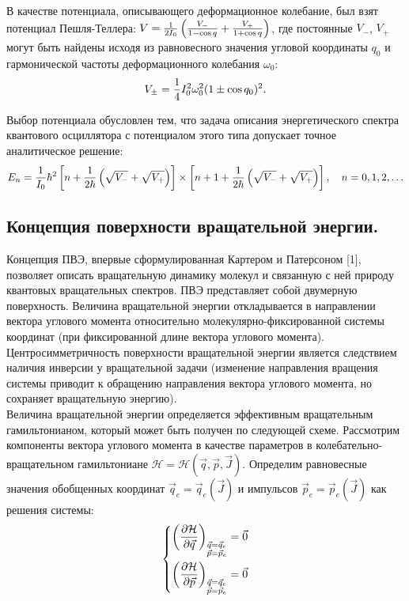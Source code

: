 В качестве потенциала, описывающего деформационное колебание, был взят потенциал Пешля-Теллера: $V = \frac{1}{2I_0} \left( \frac{V_{-}}{1 - \cos q} + \frac{V_{+}}{1 + \cos q} \right)$, где постоянные $V_{-}$, $V_{+}$ могут быть найдены исходя из равновесного значения угловой координаты $q_0$ и гармонической частоты деформационного колебания $\omega_0$:
\vverh
\begin{gather}
V_{\pm} = \frac{1}{4} I_0^2 \omega_0^2 (1 \pm \cos q_0 )^2. \notag
\end{gather}

Выбор потенциала обусловлен тем, что задача описания энергетического спектра квантового осциллятора с потенциалом этого типа допускает точное аналитическое решение:
\vverh
\begin{gather}
E_n = \frac{1}{I_0} \hbar^2 \left[ n + \frac{1}{2 \hbar} \left( \sqrt{V_{-}} + \sqrt{V_{+}} \right) \right] \times \left[ n + 1 + \frac{1}{2 \hbar} \left( \sqrt{V_{-}} + \sqrt{V_{+}} \right) \right], \quad n = 0, 1, 2, \dots \notag 
\end{gather}

\subsection{Концепция поверхности вращательной энергии.}

Концепция ПВЭ, впервые сформулированная Картером и Патерсоном [1], позволяет описать вращательную динамику молекул и связанную с ней природу квантовых вращательных спектров. ПВЭ представляет собой двумерную поверхность. Величина вращательной энергии откладывается в направлении вектора углового момента относительно молекулярно-фиксированной системы координат (при фиксированной длине вектора углового момента). Центросимметричность поверхности вращательной энергии является следствием наличия инверсии у вращательной задачи (изменение направления вращения системы приводит к обращению направления вектора углового момента, но сохраняет вращательную энергию). \\

Величина вращательной энергии определяется эффективным вращательным гамильтонианом, который может быть получен по следующей схеме. Рассмотрим компоненты вектора углового момента в качестве параметров в колебательно-вращательном гамильтониане $\mathcal{H} = \mathcal{H} (\vec{q}, \vec{p}, \vec{J})$. Определим равновесные значения обобщенных координат $\vec{q}_e = \vec{q}_e (\vec{J})$ и импульсов $\vec{p}_e = \vec{p}_e (\vec{J})$ как решения системы:
\begin{gather}
\left\{
\begin{aligned}
\left( \frac{\partial \mathcal{H}}{\partial \vec{q}} \right)_{\substack{\vec{q} = \vec{q}_e \\ \vec{p} = \vec{p}_e}} = \vec{0} \\
\left( \frac{\partial \mathcal{H}}{\partial \vec{p}} \right)_{\substack{\vec{q} = \vec{q}_e \\ \vec{p} = \vec{p}_e}} = \vec{0}
\end{aligned}
\right. \label{eff_ham}
\end{gather}

